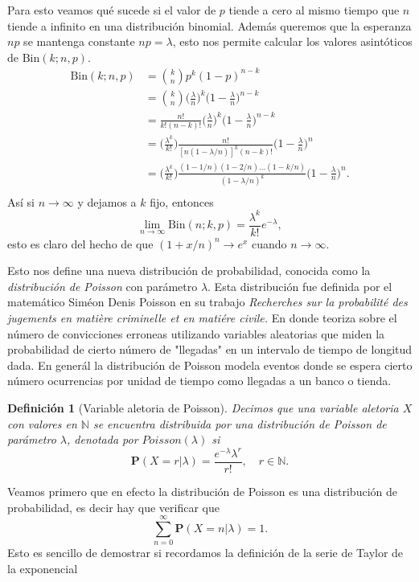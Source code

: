 \documentclass[letterpaper]{book}
\newtheorem{def.}{Definici\'on}[section]
\newcommand{\nat}{\ensuremath{ \mathbb N }}
\newcommand{\prob}{\textbf{P}}
\begin{document}
Para esto veamos qué sucede si el valor de \(p\) tiende a cero al mismo tiempo que \(n\) tiende a infinito en una distribución binomial. Además queremos que la esperanza \(np\) se mantenga constante \(np=\lambda\), esto nos permite calcular los valores asintóticos de \(\textrm{Bin}(k;n,p)\).
\begin{align*}
\textrm{Bin}(k;n,p)&={k\choose n}p^k(1-p)^{n-k}\\
&={k\choose n}\Big(\frac{\lambda}{n}\Big)^k\Big(1-\frac{\lambda}{n}\Big)^{n-k}\\
&=\frac{n!}{k!(n-k)!}\Big(\frac{\lambda}{n}\Big)^k\Big(1-\frac{\lambda}{n}\Big)^{n-k}\\
&= \Big(\frac{\lambda^k}{k!}\Big)\frac{n!}{[n(1-\lambda/n)]^k(n-k)!}\Big(1-\frac{\lambda}{n}\Big)^{n}\\
&=\Big(\frac{\lambda^k}{k!}\Big)\frac{(1-1/n)(1-2/n)\dots(1-k/n)}{(1-\lambda/n)^k}\Big(1-\frac{\lambda}{n}\Big)^{n}.\\
\end{align*}
\noindent Así si \(n\rightarrow\infty\) y dejamos a \(k\) fijo, entonces
\[
\lim_{n\rightarrow\infty}\textrm{Bin}(n;k,p)=\frac{\lambda^k}{k!}e^{-\lambda},
\]
esto es claro del hecho de que \((1+x/n)^n\rightarrow e^x\) cuando \(n\rightarrow\infty\).

Esto nos define una nueva distribución de probabilidad, conocida como la \emph{distribución de Poisson} con parámetro \(\lambda\). Esta distribución fue definida por el matemático Siméon Denis Poisson en su trabajo \emph{Recherches sur la probabilité des jugements en matière criminelle et  en matiére civile.} En donde teoriza sobre el número de convicciones erroneas utilizando variables aleatorias que miden la probabilidad de cierto número de "llegadas" en un intervalo de tiempo de longitud dada. En generál la distribución de Poisson modela eventos donde se espera cierto número ocurrencias por unidad de tiempo como llegadas a un banco o tienda.

\begin{def.}[Variable aletoria de Poisson]
Decimos que una variable aletoria \(X\) con valores en \(\nat\) se encuentra distribuida por una distribución de Poisson de parámetro \(\lambda\), denotada por \(Poisson(\lambda)\) si
\[
        \prob(X=r|\lambda)=\frac{e^{-\lambda}\lambda^r}{r!},\quad r\in\nat.
\]
\end{def.}
Veamos primero que en efecto la distribución de Poisson es una distribución de probabilidad, es decir hay que verificar que
\[
\sum_{n=0}^{\infty}\prob(X=n|\lambda)=1.
\]
Esto es sencillo de demostrar si recordamos la definición de la serie de Taylor de la exponencial
\end{document}
